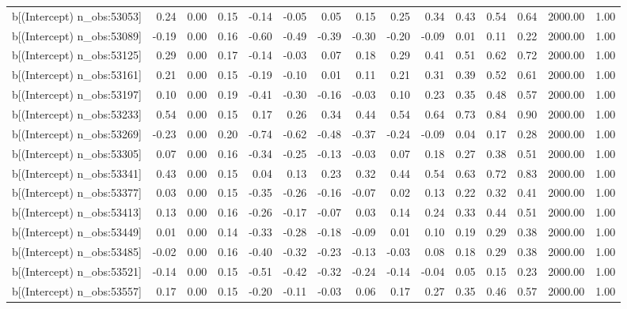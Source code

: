 \begin{table}[ht]
\begin{tabular}{rrrrrrrrrrrrrrr}
  b[(Intercept) n\_obs:53053] & 0.24 & 0.00 & 0.15 & -0.14 & -0.05 & 0.05 & 0.15 & 0.25 & 0.34 & 0.43 & 0.54 & 0.64 & 2000.00 & 1.00 \\ 
  b[(Intercept) n\_obs:53089] & -0.19 & 0.00 & 0.16 & -0.60 & -0.49 & -0.39 & -0.30 & -0.20 & -0.09 & 0.01 & 0.11 & 0.22 & 2000.00 & 1.00 \\ 
  b[(Intercept) n\_obs:53125] & 0.29 & 0.00 & 0.17 & -0.14 & -0.03 & 0.07 & 0.18 & 0.29 & 0.41 & 0.51 & 0.62 & 0.72 & 2000.00 & 1.00 \\ 
  b[(Intercept) n\_obs:53161] & 0.21 & 0.00 & 0.15 & -0.19 & -0.10 & 0.01 & 0.11 & 0.21 & 0.31 & 0.39 & 0.52 & 0.61 & 2000.00 & 1.00 \\ 
  b[(Intercept) n\_obs:53197] & 0.10 & 0.00 & 0.19 & -0.41 & -0.30 & -0.16 & -0.03 & 0.10 & 0.23 & 0.35 & 0.48 & 0.57 & 2000.00 & 1.00 \\ 
  b[(Intercept) n\_obs:53233] & 0.54 & 0.00 & 0.15 & 0.17 & 0.26 & 0.34 & 0.44 & 0.54 & 0.64 & 0.73 & 0.84 & 0.90 & 2000.00 & 1.00 \\ 
  b[(Intercept) n\_obs:53269] & -0.23 & 0.00 & 0.20 & -0.74 & -0.62 & -0.48 & -0.37 & -0.24 & -0.09 & 0.04 & 0.17 & 0.28 & 2000.00 & 1.00 \\ 
  b[(Intercept) n\_obs:53305] & 0.07 & 0.00 & 0.16 & -0.34 & -0.25 & -0.13 & -0.03 & 0.07 & 0.18 & 0.27 & 0.38 & 0.51 & 2000.00 & 1.00 \\ 
  b[(Intercept) n\_obs:53341] & 0.43 & 0.00 & 0.15 & 0.04 & 0.13 & 0.23 & 0.32 & 0.44 & 0.54 & 0.63 & 0.72 & 0.83 & 2000.00 & 1.00 \\ 
  b[(Intercept) n\_obs:53377] & 0.03 & 0.00 & 0.15 & -0.35 & -0.26 & -0.16 & -0.07 & 0.02 & 0.13 & 0.22 & 0.32 & 0.41 & 2000.00 & 1.00 \\ 
  b[(Intercept) n\_obs:53413] & 0.13 & 0.00 & 0.16 & -0.26 & -0.17 & -0.07 & 0.03 & 0.14 & 0.24 & 0.33 & 0.44 & 0.51 & 2000.00 & 1.00 \\ 
  b[(Intercept) n\_obs:53449] & 0.01 & 0.00 & 0.14 & -0.33 & -0.28 & -0.18 & -0.09 & 0.01 & 0.10 & 0.19 & 0.29 & 0.38 & 2000.00 & 1.00 \\ 
  b[(Intercept) n\_obs:53485] & -0.02 & 0.00 & 0.16 & -0.40 & -0.32 & -0.23 & -0.13 & -0.03 & 0.08 & 0.18 & 0.29 & 0.38 & 2000.00 & 1.00 \\ 
  b[(Intercept) n\_obs:53521] & -0.14 & 0.00 & 0.15 & -0.51 & -0.42 & -0.32 & -0.24 & -0.14 & -0.04 & 0.05 & 0.15 & 0.23 & 2000.00 & 1.00 \\ 
  b[(Intercept) n\_obs:53557] & 0.17 & 0.00 & 0.15 & -0.20 & -0.11 & -0.03 & 0.06 & 0.17 & 0.27 & 0.35 & 0.46 & 0.57 & 2000.00 & 1.00 \\ 

\end{tabular}
\end{table}
